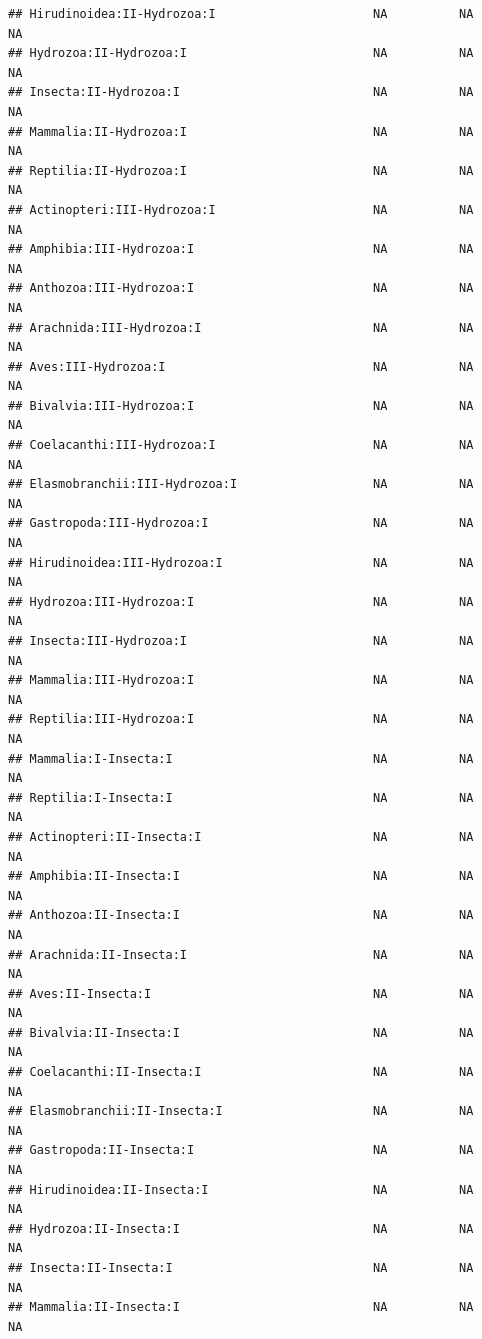 \documentclass[
  12pt,
]{article}
\begin{document}
\begin{verbatim}
## Hirudinoidea:II-Hydrozoa:I                      NA          NA          NA
## Hydrozoa:II-Hydrozoa:I                          NA          NA          NA
## Insecta:II-Hydrozoa:I                           NA          NA          NA
## Mammalia:II-Hydrozoa:I                          NA          NA          NA
## Reptilia:II-Hydrozoa:I                          NA          NA          NA
## Actinopteri:III-Hydrozoa:I                      NA          NA          NA
## Amphibia:III-Hydrozoa:I                         NA          NA          NA
## Anthozoa:III-Hydrozoa:I                         NA          NA          NA
## Arachnida:III-Hydrozoa:I                        NA          NA          NA
## Aves:III-Hydrozoa:I                             NA          NA          NA
## Bivalvia:III-Hydrozoa:I                         NA          NA          NA
## Coelacanthi:III-Hydrozoa:I                      NA          NA          NA
## Elasmobranchii:III-Hydrozoa:I                   NA          NA          NA
## Gastropoda:III-Hydrozoa:I                       NA          NA          NA
## Hirudinoidea:III-Hydrozoa:I                     NA          NA          NA
## Hydrozoa:III-Hydrozoa:I                         NA          NA          NA
## Insecta:III-Hydrozoa:I                          NA          NA          NA
## Mammalia:III-Hydrozoa:I                         NA          NA          NA
## Reptilia:III-Hydrozoa:I                         NA          NA          NA
## Mammalia:I-Insecta:I                            NA          NA          NA
## Reptilia:I-Insecta:I                            NA          NA          NA
## Actinopteri:II-Insecta:I                        NA          NA          NA
## Amphibia:II-Insecta:I                           NA          NA          NA
## Anthozoa:II-Insecta:I                           NA          NA          NA
## Arachnida:II-Insecta:I                          NA          NA          NA
## Aves:II-Insecta:I                               NA          NA          NA
## Bivalvia:II-Insecta:I                           NA          NA          NA
## Coelacanthi:II-Insecta:I                        NA          NA          NA
## Elasmobranchii:II-Insecta:I                     NA          NA          NA
## Gastropoda:II-Insecta:I                         NA          NA          NA
## Hirudinoidea:II-Insecta:I                       NA          NA          NA
## Hydrozoa:II-Insecta:I                           NA          NA          NA
## Insecta:II-Insecta:I                            NA          NA          NA
## Mammalia:II-Insecta:I                           NA          NA          NA

\end{verbatim}
\end{document}
